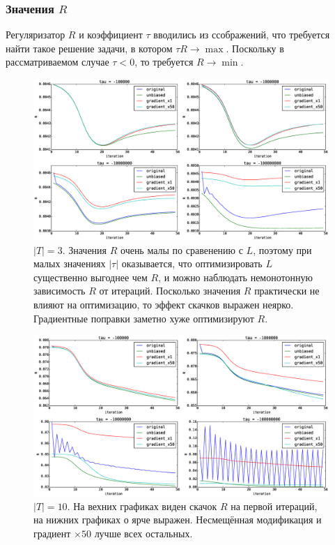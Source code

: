 \documentclass[12pt]{article}
\begin{document}
\subsubsection{Значения $R$}
Регуляризатор $R$ и коэффициент $\tau$  вводились из ссображений, что требуется найти такое решение задачи, в котором $\tau R \to \max$. Поскольку в рассматриваемом случае $\tau < 0$, то требуется $R \to \min$.\\
\begin{figure}[H]
	\centering
	\caption{$|T| = 3$. Значения $R$ очень малы по сравенению с $L$, поэтому при малых значениях $|\tau|$ оказывается, что оптимизировать $L$ существенно выгоднее чем $R$, и можно наблюдать немонотонную зависимость $R$ от итераций. Посколько значения $R$ практически не влияют на оптимизацию, то эффект скачков выражен неярко. Градиентные поправки заметно хуже оптимизируют $R$.}    
	\medskip
	\includegraphics[width=1.0\linewidth]{pictures/topics_3_R_values}
\end{figure}
\begin{figure}[H]
	\centering
	\caption{$|T| = 10$. На вехних графиках виден скачок $R$ на первой итераций, на нижних графиках о ярче выражен. Несмещённая модификация и градиент $\times 50$  лучше всех остальных.}    
	\includegraphics[width=1.0\linewidth]{pictures/topics_10_R_values}
\end{figure}
\end{document}
